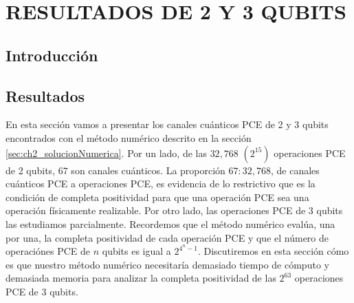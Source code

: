 \chapter{RESULTADOS DE 2 Y 3 QUBITS}
\section{Introducción}

\section{Resultados}

En esta sección vamos a presentar los canales cuánticos PCE de 2 y 3 qubits 
encontrados con el método numérico descrito en la sección 
\ref{sec:ch2_solucionNumerica}. 
Por un lado, de las $32,768$ $(2^{15})$ operaciones PCE de 2 qubits, 
$67$ son canales cuánticos. La proporción $67:32,768$, de canales cuánticos PCE
a operaciones PCE, es evidencia de lo restrictivo
que es la condición de completa positividad para que una operación PCE 
sea una operación físicamente realizable. 
Por otro lado, las operaciones PCE de 3 qubits las estudiamos parcialmente.
Recordemos que el método numérico evalúa, una por una, la completa positividad 
de cada operación PCE y que el número de operaciónes PCE de $n$ qubits es igual
a $2^{4^n-1}$. Discutiremos en esta sección cómo es que nuestro 
método numérico necesitaría demasiado tiempo de cómputo y demasiada 
memoria para analizar la completa positividad de las $2^{63}$ 
operaciones PCE de 3 qubits.


